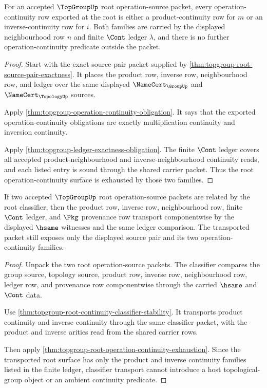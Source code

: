 \begin{theorem}
\label{thm:topgroup-root-operation-continuity-exhaustion}
For an accepted $\TopGroupUp$ root operation-source packet, every
operation-continuity row exported at the root is either a product-continuity
row for $m$ or an inverse-continuity row for $i$. Both families are carried by
the displayed neighbourhood row $n$ and finite $\Cont$ ledger $\lambda$, and
there is no further operation-continuity predicate outside the packet.
\end{theorem}
\begin{proof}
Start with the exact source-pair packet supplied by
\autoref{thm:topgroup-root-source-pair-exactness}. It places the product row,
inverse row, neighbourhood row, and ledger over the same displayed
$\NameCert_{\GroupUp}$ and $\NameCert_{\TopologyUp}$ sources.

Apply \autoref{thm:topgroup-operation-continuity-obligation}. It says that
the exported operation-continuity obligations are exactly multiplication
continuity and inversion continuity.

Apply \autoref{thm:topgroup-ledger-exactness-obligation}. The finite $\Cont$
ledger covers all accepted product-neighbourhood and inverse-neighbourhood
continuity reads, and each listed entry is sound through the shared carrier
packet. Thus the root operation-continuity surface is exhausted by those two
families.
\end{proof}

\begin{theorem}
\label{thm:topgroup-root-classifier-ledger-stability}
If two accepted $\TopGroupUp$ root operation-source packets are related by the
root classifier, then the product row, inverse row, neighbourhood row, finite
$\Cont$ ledger, and $\Pkg$ provenance row transport componentwise by the
displayed $\hsame$ witnesses and the same ledger comparison. The transported
packet still exposes only the displayed source pair and its two
operation-continuity families.
\end{theorem}
\begin{proof}
Unpack the two root operation-source packets. The classifier compares the
group source, topology source, product row, inverse row, neighbourhood row,
ledger row, and provenance row componentwise through the carried $\hsame$ and
$\Cont$ data.

Use \autoref{thm:topgroup-root-continuity-classifier-stability}. It transports
product continuity and inverse continuity through the same classifier packet,
with the product and inverse arities read from the shared carrier rows.

Then apply \autoref{thm:topgroup-root-operation-continuity-exhaustion}. Since
the transported root surface has only the product and inverse continuity
families listed in the finite ledger, classifier transport cannot introduce a
host topological-group object or an ambient continuity predicate.
\end{proof}


